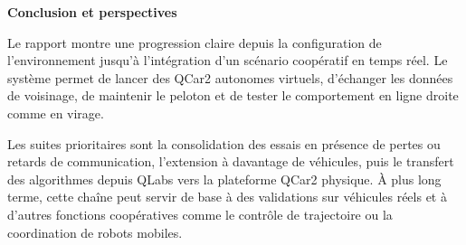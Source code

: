 \documentclass[10pt,a4paper]{article}
\newcommand{\sectiontitle}[1]{%
  \vspace{2.5mm}
  {\large\bfseries\color{accent} #1}\par
  \vspace{1mm}
}
\begin{document}
\sectiontitle{Conclusion et perspectives}
Le rapport montre une progression claire depuis la configuration de l'environnement jusqu'\`a l'int\'egration d'un sc\'enario coop\'eratif en temps r\'eel. Le syst\`eme permet de lancer des QCar2 autonomes virtuels, d'\'echanger les donn\'ees de voisinage, de maintenir le peloton et de tester le comportement en ligne droite comme en virage.

Les suites prioritaires sont la consolidation des essais en pr\'esence de pertes ou retards de communication, l'extension \`a davantage de v\'ehicules, puis le transfert des algorithmes depuis QLabs vers la plateforme QCar2 physique. \`A plus long terme, cette cha\^ine peut servir de base \`a des validations sur v\'ehicules r\'eels et \`a d'autres fonctions coop\'eratives comme le contr\^ole de trajectoire ou la coordination de robots mobiles.

\vspace{2mm}
\begin{center}
\end{center}
\end{document}
